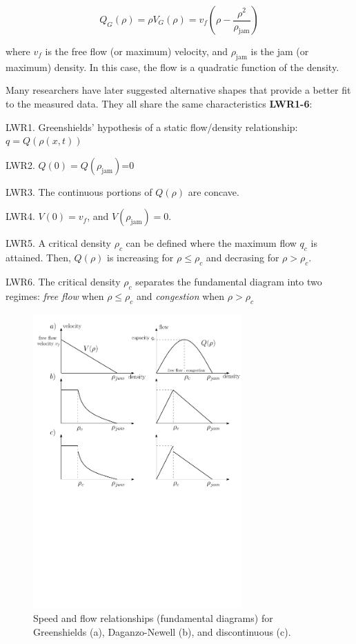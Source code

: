 \begin{equation} \label{eq:greenshieldsFlux}
Q_{G}(\rho) = \rho V_{G}(\rho) = v_{f}(\rho-\frac{\rho^{2}}{\rho_{\text{jam}}})
\end{equation}

where $v_{f}$ is the free flow (or maximum) velocity, and $\rho_{\text{jam}}$ is the jam (or maximum) density. In this case, the flow is a quadratic function of the density. 

Many researchers have later suggested alternative shapes that provide a better fit to the measured data. They all share the same characteristics \textbf{LWR1-6}:

LWR1. Greenshields' hypothesis of a static flow/density relationship: $q = Q(\rho(x,t))$

LWR2. $Q(0)=Q(\rho_{\text{jam}})$=0

LWR3. The continuous portions of $Q(\rho)$ are concave.

LWR4. $V(0) = v_{f}$, and $V(\rho_{\text{jam}}) = 0$.

LWR5. A critical density $\rho_{c}$ can be defined where the maximum flow $q_{c}$ is attained. Then, $Q(\rho)$ is increasing for $\rho \leq \rho_{c}$ and decrasing for $\rho > \rho_{c}$.

LWR6. The critical density $\rho_{c}$ separates the fundamental diagram into two regimes: \textit{free flow} when $\rho \leq \rho_{c}$ and \textit{congestion} when $\rho > \rho_{c}$

\begin{figure}[ht]
  \centering
    \includegraphics[width=8cm]{figures/fundamentalDiagram2.pdf}
    \caption{Speed and flow relationships (fundamental diagrams) for Greenshields (a), Daganzo-Newell (b), and discontinuous (c).}
    \label{fig:fundamentalDiagram}
\end{figure}

